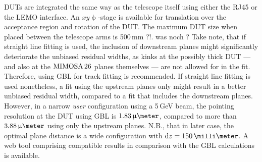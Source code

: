 
DUTs are integrated the same way as the telescope itself using either the RJ45 or the LEMO interface. 
An $xy\upphi$-stage is available for translation over the acceptance region and rotation of the DUT. 
The maximum DUT size when placed between the telescope arms is 500\,mm ?!.
was noch ?
Take note, that if straight line fitting is used, the inclusion of downstream planes might significantly deteriorate the unbiased residual widths,
 as kinks at the possibly thick DUT --- and also at the $\textrm{MIMOSA\,26}$ planes themselves --- are not allowed for in the fit.
Therefore, using GBL for track fitting is recommended. 
If straight line fitting is used nonetheless, a fit using the upstream planes only might result in a better unbiased residual width, compared to a fit that includes the downstream planes.
However, in a narrow \textit{user} configuration using a 5\,GeV beam, the pointing resolution at the DUT using GBL is $1.83\,\upmu\meter$, compared to more than $3.88\,\upmu\meter$ using only the upstream planes.
N.B., that in later case, the optimal plane distance is a wide configuration with $\dz = 150\,\milli\meter$.
A web tool comprising compatible results in comparison with the GBL calculations is available.\,\cite{webtool}